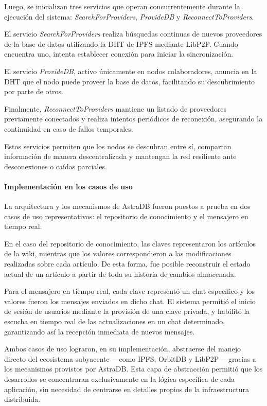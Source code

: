 Luego, se inicializan tres servicios que operan concurrentemente durante la ejecución del sistema: \textit{SearchForProviders}, \textit{ProvideDB} y \textit{ReconnectToProviders}.

El servicio \textit{SearchForProviders} realiza búsquedas continuas de nuevos proveedores de la base de datos utilizando la DHT de IPFS mediante LibP2P. Cuando encuentra uno, intenta establecer conexión para iniciar la sincronización.

El servicio \textit{ProvideDB}, activo únicamente en nodos colaboradores, anuncia en la DHT que el nodo puede proveer la base de datos, facilitando su descubrimiento por parte de otros.

Finalmente, \textit{ReconnectToProviders} mantiene un listado de proveedores previamente conectados y realiza intentos periódicos de reconexión, asegurando la continuidad en caso de fallos temporales.

Estos servicios permiten que los nodos se descubran entre sí, compartan información de manera descentralizada y mantengan la red resiliente ante desconexiones o caídas parciales.

\paragraph{Implementación en los casos de uso}

La arquitectura y los mecanismos de AstraDB fueron puestos a prueba en dos casos de uso representativos: el repositorio de conocimiento y el mensajero en tiempo real.

En el caso del repositorio de conocimiento, las claves representaron los artículos de la wiki, mientras que los valores correspondieron a las modificaciones realizadas sobre cada artículo. De esta forma, fue posible reconstruir el estado actual de un artículo a partir de toda su historia de cambios almacenada.

Para el mensajero en tiempo real, cada clave representó un chat específico y los valores fueron los mensajes enviados en dicho chat. El sistema permitió el inicio de sesión de usuarios mediante la provisión de una clave privada, y habilitó la escucha en tiempo real de las actualizaciones en un chat determinado, garantizando así la recepción inmediata de nuevos mensajes.

Ambos casos de uso lograron, en su implementación, abstraerse del manejo directo del ecosistema subyacente —como IPFS, OrbitDB y LibP2P— gracias a los mecanismos provistos por AstraDB. Esta capa de abstracción permitió que los desarrollos se concentraran exclusivamente en la lógica específica de cada aplicación, sin necesidad de centrarse en detalles propios de la infraestructura distribuida.

